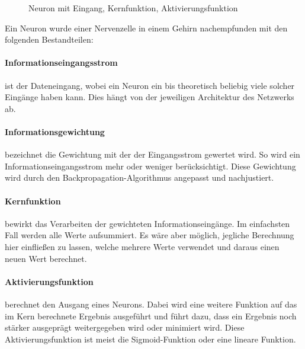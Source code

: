 \begin{figure}
\centering


	\caption{Neuron mit Eingang, Kernfunktion, Aktivierungsfunktion}
	\label{fig:Neuron}
\end{figure}

Ein Neuron wurde einer Nervenzelle in einem Gehirn nachempfunden mit den folgenden Bestandteilen:
\paragraph{Informationseingangsstrom} ist der Dateneingang, wobei ein Neuron ein bis theoretisch beliebig viele solcher Eingänge haben kann. 
Dies hängt von der jeweiligen Architektur des Netzwerks ab.

\paragraph{Informationsgewichtung} bezeichnet die Gewichtung mit der der Eingangsstrom gewertet wird. 
So wird ein Informationseingangsstrom mehr oder weniger berücksichtigt. 
Diese Gewichtung wird durch den Backpropagation-Algorithmus angepasst und nachjustiert.

\paragraph{Kernfunktion} bewirkt das Verarbeiten der gewichteten Informationseingänge. 
Im einfachsten Fall werden alle Werte aufsummiert. 
Es wäre aber möglich, jegliche Berechnung hier einfließen zu lassen, welche mehrere Werte verwendet und daraus einen neuen Wert berechnet.

\paragraph{Aktivierungsfunktion} berechnet den Ausgang eines Neurons. 
Dabei wird eine weitere Funktion auf das im Kern berechnete Ergebnis ausgeführt und führt dazu, dass ein Ergebnis noch stärker ausgeprägt weitergegeben wird oder minimiert wird. 
Diese Aktivierungsfunktion ist meist die Sigmoid-Funktion oder eine lineare Funktion. 

